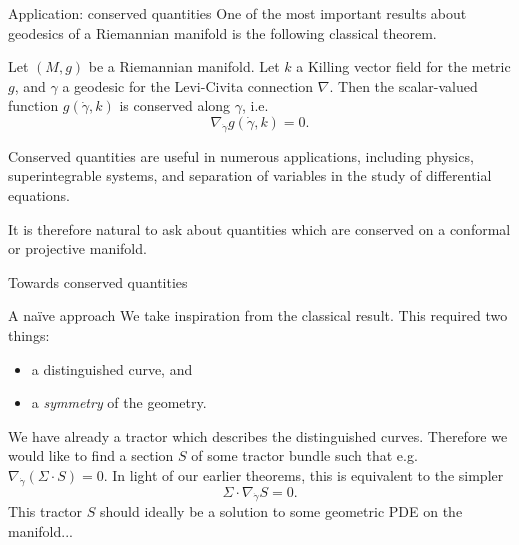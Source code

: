 \documentclass[handout]{beamer}
\begin{document}
\begin{frame}{Application: conserved quantities}
  One of the most important results about geodesics of a Riemannian manifold is
  the following classical theorem.
  \pause
  \begin{Theorem}
    Let \( (M,g) \) be a Riemannian manifold.
    Let \( k \) a Killing vector field for the metric \( g \), and \( \gamma \)
    a geodesic for the Levi-Civita connection \( \nabla \).
    Then the scalar-valued function \( g(\dot{\gamma},k) \) is conserved along
    \( \gamma \), i.e.
    \[
      \nabla_{\dot{\gamma}} g(\dot{\gamma}, k) = 0.
    \]
  \end{Theorem}
  \pause
  Conserved quantities are useful in numerous applications, including
  physics, superintegrable systems, and separation of variables in the study of
  differential equations.

  It is therefore natural to ask about quantities which are conserved on a conformal or projective manifold. 
\end{frame}

\begin{frame}{Towards conserved quantities}
  \begin{block}{A na\"{i}ve approach}
    We take inspiration from the classical result. 
      This required two things:
      \begin{itemize}
        \pause
        \item a distinguished curve, and
        \pause
        \item a \emph{symmetry} of the geometry.
      \end{itemize}
      \pause
      We have already a tractor which describes the distinguished curves. Therefore we would like to find a section \( S \) of some tractor bundle such that e.g. \( \nabla_{\dot{\gamma}} \left(\Sigma \cdot S \right) = 0 \). 
      In light of our earlier theorems, this is equivalent to the simpler
      \[
        \Sigma \cdot \nabla_{\dot{\gamma}} S = 0.
      \]
      This tractor \( S \) should ideally be a solution to some geometric PDE on the manifold...
  \end{block}
\end{frame}
\end{document}
